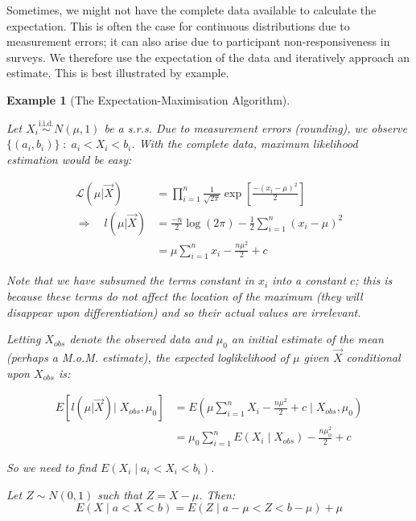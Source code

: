 \documentclass[12pt,a4paper]{article}
\newtheorem{ex}[thm]{Example}
\begin{document}
Sometimes, we might not have the complete data available to calculate the expectation. This is often the case for continuous distributions due to measurement errors; it can also arise due to participant non-responsiveness in surveys. We therefore use the expectation of the data and iteratively approach an estimate. This is best illustrated by example.

\begin{ex}[The Expectation-Maximisation Algorithm]$\;$\par\vspace{1cm}

Let $X_i \overset{\text{i.i.d.}}{\sim} N(\mu, 1)$ be a s.r.s. Due to measurement errors (rounding), we observe $\{(a_i,b_i)\}\; : \; a_i < X_i < b_i$. With the complete data, maximum likelihood estimation would be easy:

\begin{align*}
\mathcal{L}\left(\mu \big| \vec{X}\right) &= \prod_{i=1}^n \frac{1}{\sqrt{2\pi}} \exp\left[\frac{-(x_i-\mu)^2}{2}\right]\\
\Rightarrow\quad l\left(\mu \big| \vec{X}\right) &= \frac{-n}{2} \log(2\pi) - \frac{1}{2} \sum_{i=1}^n (x_i - \mu)^2\\
&= \mu \sum_{i=1}^n x_i - \frac{n \mu^2}{2} + c
\end{align*}

Note that we have subsumed the terms constant in $x_i$ into a constant $c$; this is because these terms do not affect the location of the maximum (they will disappear upon differentiation) and so their actual values are irrelevant.

Letting $X_{obs}$ denote the observed data and $\mu_0$ an initial estimate of the mean (perhaps a M.o.M. estimate), the expected loglikelihood of $\mu$ given $\vec{X}$ conditional upon $X_{obs}$ is:

\begin{align*}
E\left[l\left(\mu | \vec{X}\right) \bigg| \; X_{obs},\mu_0\right] &= E\left(\mu \sum_{i=1}^n X_i - \frac{n\mu^2}{2} + c\;\Bigg|\; X_{obs},\mu_0\right)\\
&= \mu_0 \sum_{i=1}^n E(X_i \mid X_{obs}) - \frac{n\mu_0^2}{2} + c
\end{align*}

So we need to find $E(X_i \mid a_i < X_i < b_i)$.

Let $Z \sim N(0,1)$ such that $Z=X-\mu$. Then:
$$E(X\mid a<X<b) = E(Z \mid a-\mu<Z<b-\mu) + \mu$$


\end{ex}
\end{document}
